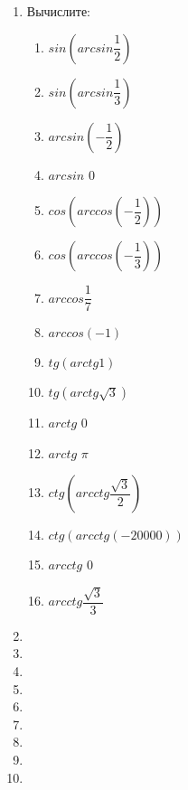 \documentclass[12pt, a4paper]{article}
\begin{document}
	
	\begin{enumerate}
		\item Вычислите:
		\begin{multicols}{3}
			\begin{enumerate}[label=\asbuk*)]
			\item $sin\left( arcsin \dfrac{1}{2}\right) $
			\item $sin\left( arcsin \dfrac{1}{3}\right) $
			\item $arcsin \left( -\dfrac{1}{2}\right) $
			\item $arcsin $ $0$
			\item $cos\left( arccos \left( -\dfrac{1}{2}\right) \right) $
			\item $cos\left( arccos \left( -\dfrac{1}{3}\right) \right) $
			\item $arccos\dfrac{1}{7}$
			\item $arccos(-1)$
			\item $tg(arctg1)$
			\item $tg(arctg\sqrt{3})$
			\item $arctg$ $0$
			\item $arctg$ $\pi$
			\item $ctg\left( arcctg\dfrac{\sqrt{3}}{2}\right) $
			\item $ctg(arcctg(-20000))$
			\item $arcctg$ $0$
			\item $arcctg\dfrac{\sqrt{3}}{3}$
		\end{enumerate}
		\end{multicols}
		\item 
		\item 
		\item
		\item 
		\item 
		\item
		\item
		\item
		\item 
	\end{enumerate}
\end{document}
